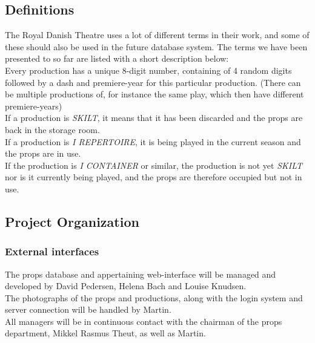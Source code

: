 \documentclass[12pt]{article}
\begin{document}
\subsection{Definitions}
The Royal Danish Theatre uses a lot of different terms in their work, and some of these should also be used in the future database system. The terms we have been presented to so far are listed with a short description below: \\
Every production has a unique 8-digit number, containing of 4 random digits followed by a dash and premiere-year for this particular production. (There can be multiple productions of, for instance the same play, which then have different premiere-years) \\
If a production is \textit{SKILT}, it means that it has been discarded and the props are back in the storage room. \\
If a production is \textit{I REPERTOIRE}, it is being played in the current season and the props are in use. \\
If the production is \textit{I CONTAINER} or similar, the production is not yet \textit{SKILT} nor is it currently being played, and the props are therefore occupied but not in use.
\subsection{Project Organization}
\subsubsection{External interfaces}
The props database and appertaining web-interface will be managed and developed by David Pedersen, Helena Bach and Louise Knudsen. \\
The photographs of the props and productions, along with the login system and server connection will be handled by Martin. \\
All managers will be in continuous contact with the chairman of the props department, Mikkel Rasmus Theut, as well as Martin. 
\end{document}
